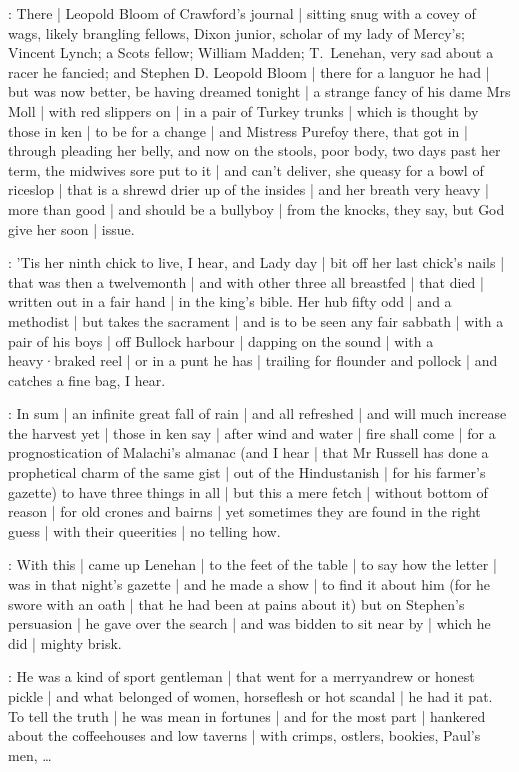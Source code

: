 :
There |
Leopold Bloom of Crawford's journal |
sitting snug with a covey of wags,
likely brangling fellows,
Dixon junior,
scholar of my lady of Mercy's;
Vincent Lynch;
a Scots fellow;
William Madden;
T.~Lenehan,
very sad about a racer he fancied;
and Stephen D.
Leopold Bloom |
there for a languor he had |
but was now better,
be having dreamed tonight |
a strange fancy of his dame Mrs Moll |
with red slippers on |
in a pair of Turkey trunks |
which is thought by those in ken |
to be for a change |
and Mistress Purefoy there,
that got in |
through pleading her belly,
and now on the stools,
poor body,
two days past her term,
the midwives sore put to it |
and can't deliver,
she queasy for a bowl of riceslop |
that is a shrewd drier up of the insides |
and her breath very heavy |
more than good |
and should be a bullyboy |
from the knocks,
they say,
but God give her soon |
issue.

:
'Tis her ninth chick to live,
I hear,
and Lady day |
bit off her last chick's nails |
that was then a twelvemonth |
and with other three all breastfed |
that died |
written out in a fair hand |
in the king's bible.
Her hub fifty odd |
and a methodist |
but takes the sacrament |
and is to be seen any fair sabbath |
with a pair of his boys |
off Bullock harbour |
dapping on the sound |
with a heavy·braked reel |
or in a punt he has |
trailing for flounder and pollock |
and catches a fine bag,
I hear.

:
In sum |
an infinite great fall of rain |
and all refreshed |
and will much increase the harvest yet |
those in ken say |
after wind and water |
fire shall come |
for a prognostication of Malachi's almanac
(and I hear |
that Mr Russell has done a prophetical charm of the same gist |
out of the Hindustanish |
for his farmer's gazette)
to have three things in all |
but this a mere fetch |
without bottom of reason |
for old crones and bairns |
yet sometimes they are found in the right guess |
with their queerities |
no telling how.



:
With this |
came up Lenehan |
to the feet of the table |
to say how the letter |
was in that night's gazette |
and he made a show |
to find it about him
(for he swore with an oath |
that he had been at pains about it)
but on Stephen's persuasion |
he gave over the search |
and was bidden to sit near by |
which he did |
mighty brisk.

:
He was a kind of sport gentleman |
that went for a merryandrew or honest pickle |
and what belonged of women,
horseflesh or hot scandal |
he had it pat.
To tell the truth |
he was mean in fortunes |
and for the most part |
hankered about the coffeehouses and low taverns |
with crimps,
ostlers,
bookies,
Paul's men,
\dots

